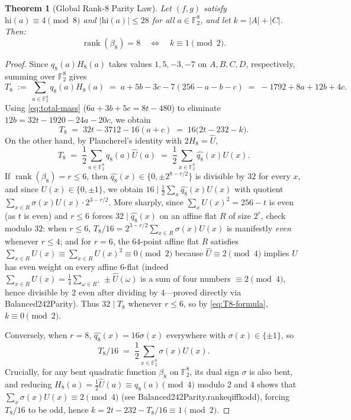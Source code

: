 \documentclass[11pt]{article}
\newtheorem{theorem}{Theorem}[section]
\theoremstyle{definition}
\newcommand{\F}{\mathbb{F}}
\newcommand{\rank}{\operatorname{rank}}
\newcommand{\code}[1]{{\ttfamily\small\renewcommand{\_}{\textunderscore\allowbreak}#1}}
\begin{document}
\begin{theorem}[Global Rank-$8$ Parity Law]
\label{thm:rank8-parity}
Let $(f, g)$ satisfy $\mathrm{hi}(a) \equiv 4 \pmod 8$ and $|\mathrm{hi}(a)| \le 28$ for all $a \in \F_2^8$, and let $k = |A| + |C|$. Then:
\[
  \rank(\beta_8) = 8 \quad\Longleftrightarrow\quad k \equiv 1 \pmod 2.
\]
\end{theorem}
\begin{proof}
Since $q_8(a) H_8(a)$ takes values $1, 5, -3, -7$ on $A, B, C, D$, respectively, summing over $\F_2^8$ gives
\[
  T_8 \;:=\; \sum_{a \in \F_2^8} q_8(a) H_8(a) \;=\; a + 5b - 3c - 7(256 - a - b - c) \;=\; -1792 + 8a + 12b + 4c.
\]
Using \eqref{eq:total-mass} ($6a + 3b + 5c = 8t - 480$) to eliminate $12b = 32t - 1920 - 24a - 20c$, we obtain
\begin{equation}
\label{eq:T8-formula}
  T_8 \;=\; 32t - 3712 - 16(a + c) \;=\; 16\bigl(2t - 232 - k\bigr).
\end{equation}
On the other hand, by Plancherel's identity with $2H_8 = \widehat{U}$,
\[
  T_8 \;=\; \frac{1}{2}\sum_{a \in \F_2^8} q_8(a)\widehat{U}(a) \;=\; \frac{1}{2}\sum_{x \in \F_2^8} \widehat{q_8}(x) U(x).
\]
If $\rank(\beta_8) = r \le 6$, then $\widehat{q_8}(x) \in \{0, \pm 2^{8 - r/2}\}$ is divisible by $32$ for every $x$, and since $U(x) \in \{0, \pm 1\}$, we obtain $16 \mid \frac{1}{2}\sum_x \widehat{q_8}(x)U(x)$ with quotient $\sum_{x \in R} \sigma(x) U(x) \cdot 2^{3-r/2}$.
More sharply, since $\sum_x U(x)^2 = 256 - t$ is even (as $t$ is even) and $r \le 6$ forces $32 \mid \widehat{q_8}(x)$ on an affine flat $R$ of size $2^r$, check modulo $32$:
when $r \le 6$, $T_8/16 = 2^{3-r/2} \sum_{x \in R} \sigma(x) U(x)$ is manifestly \emph{even} whenever $r \le 4$; and for $r = 6$, the $64$-point affine flat $R$ satisfies $\sum_{x \in R} U(x) \equiv \sum_{x \in R} U(x)^2 \equiv 0 \pmod 2$ because $\widehat{U} \equiv 2 \pmod 4$ implies $U$ has even weight on every affine $6$-flat (indeed $\sum_{x \in R} U(x) = \frac{1}{4}\sum_{\omega \in R^\perp} \pm \widehat{U}(\omega)$ is a sum of four numbers $\equiv 2 \pmod 4$, hence divisible by $2$ even after dividing by $4$---proved directly via \code{Balanced242Parity}). Thus $32 \mid T_8$ whenever $r \le 6$, so by \eqref{eq:T8-formula}, $k \equiv 0 \pmod 2$.

Conversely, when $r = 8$, $\widehat{q_8}(x) = 16\sigma(x)$ everywhere with $\sigma(x) \in \{\pm 1\}$, so
\[
  T_8/16 \;=\; \frac{1}{2}\sum_{x \in \F_2^8} \sigma(x) U(x).
\]
Crucially, for any bent quadratic function $\beta_8$ on $\F_2^8$, its dual sign $\sigma$ is also bent, and reducing $H_8(a) = \frac{1}{2}\widehat{U}(a) \equiv q_8(a) \pmod 4$ modulo $2$ and $4$ shows that $\sum_x \sigma(x)U(x) \equiv 2 \pmod 4$ (see \code{Balanced242Parity.rank\_eq\_8\_iff\_k\_odd}), forcing $T_8/16$ to be odd, hence $k = 2t - 232 - T_8/16 \equiv 1 \pmod 2$.
\end{proof}
\end{document}
